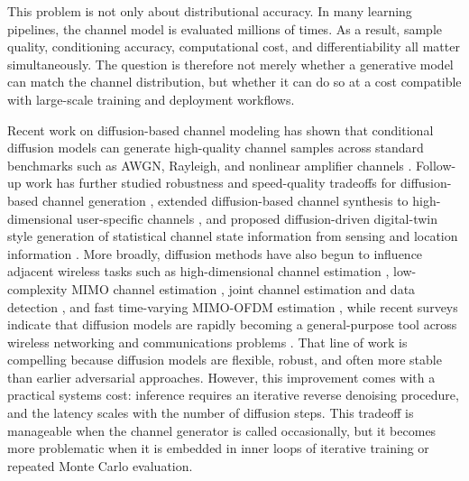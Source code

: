 \documentclass[conference]{IEEEtran}
\begin{document}
This problem is not only about distributional accuracy.
In many learning pipelines, the channel model is evaluated millions of times.
As a result, sample quality, conditioning accuracy, computational cost, and differentiability all matter simultaneously.
The question is therefore not merely whether a generative model can match the channel distribution, but whether it can do so at a cost compatible with large-scale training and deployment workflows.

Recent work on diffusion-based channel modeling has shown that conditional diffusion models can generate high-quality channel samples across standard benchmarks such as AWGN, Rayleigh, and nonlinear amplifier channels \cite{paper2309}.
Follow-up work has further studied robustness and speed-quality tradeoffs for diffusion-based channel generation \cite{kimicc2024}, extended diffusion-based channel synthesis to high-dimensional user-specific channels \cite{lee2024highdimchannels}, and proposed diffusion-driven digital-twin style generation of statistical channel state information from sensing and location information \cite{gong2025dtoc}.
More broadly, diffusion methods have also begun to influence adjacent wireless tasks such as high-dimensional channel estimation \cite{zhou2025channelestimation}, low-complexity MIMO channel estimation \cite{fesl2024mimoestimation,chen2025mimovi}, joint channel estimation and data detection \cite{zilberstein2024joint}, and fast time-varying MIMO-OFDM estimation \cite{liu2025mimoofdm}, while recent surveys indicate that diffusion models are rapidly becoming a general-purpose tool across wireless networking and communications problems \cite{fan2025wirelesssurvey,luong2025futurenetworksurvey}.
That line of work is compelling because diffusion models are flexible, robust, and often more stable than earlier adversarial approaches.
However, this improvement comes with a practical systems cost: inference requires an iterative reverse denoising procedure, and the latency scales with the number of diffusion steps.
This tradeoff is manageable when the channel generator is called occasionally, but it becomes more problematic when it is embedded in inner loops of iterative training or repeated Monte Carlo evaluation.
\end{document}
